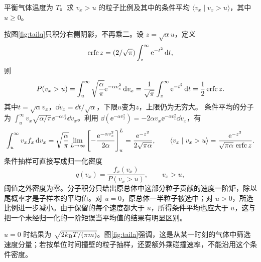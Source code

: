 \begin{example}[速度分量的阈值与尾概率]
平衡气体温度为 $T$。求 $v_x>u$ 的粒子比例及其中的条件平均 $\langle v_x\mid v_x>u\rangle$，其中 $u\ge0$。
\end{example}
\begin{solution}
按图\ref{fig:tailq}只积分右侧阴影，不再乘二。设 $z=\sqrt\alpha u$，定义
\[
 \operatorname{erfc} z=(2/\sqrt\pi)\int_z^\infty\mathrm e^{-t^2}\mathop{}\!\mathrm d t,
\]
则
\[
 P(v_x>u)=\int_u^\infty\sqrt{\frac\alpha\pi}\mathrm e^{-\alpha v_x^2}\mathop{}\!\mathrm d v_x
=\frac1{\sqrt\pi}\int_z^\infty\mathrm e^{-t^2}\mathop{}\!\mathrm d t
=\frac12\operatorname{erfc} z.
\]
其中$t=\sqrt\alpha v_x$，$\dd v_x=\dd t/\sqrt\alpha$，下限$u$变为$z$，上限仍为无穷大。
条件平均的分子为 $\int_u^\infty v_x\sqrt{\alpha/\pi}\ee^{-\alpha v_x^2}\dd v_x$。利用 $\dd(\ee^{-\alpha v_x^2})=-2\alpha v_x\ee^{-\alpha v_x^2}\dd v_x$，有
\[
 \int_u^\infty v_x f_x\mathop{}\!\mathrm d v_x
 =\sqrt{\frac\alpha\pi}\lim_{L\to\infty}
 \left[-\frac{\mathrm e^{-\alpha v_x^2}}{2\alpha}\right]_u^L
 =\frac{\mathrm e^{-z^2}}{2\sqrt{\pi\alpha}},\qquad
 \langle v_x\mid v_x>u\rangle=
 \frac{\mathrm e^{-z^2}}{\sqrt{\pi\alpha}\,\operatorname{erfc} z}.
\]
条件抽样可直接写成归一化密度
\[
 q(v_x)=\frac{f_x(v_x)}{P(v_x>u)},\qquad v_x>u,
\]
阈值之外密度为零。分子积分只给出原总体中这部分粒子贡献的速度一阶矩，除以尾概率才是子样本的平均值。对 $u=0$，原总体一半粒子被选中；对 $u>0$，所选比例进一步减小。由于保留的每个速度都大于 $u$，所得条件平均也应大于 $u$，这与把一个未经归一化的一阶矩误当平均值的结果有明显区别。

$u=0$ 时结果为 $\sqrt{2k_{\mathrm B} T/(\pi m)}$。图\ref{fig:taila}强调，这是从某一时刻的气体中筛选速度分量；若按单位时间撞壁的粒子抽样，还要额外乘碰撞速率，不能沿用这个条件密度。
\end{solution}


